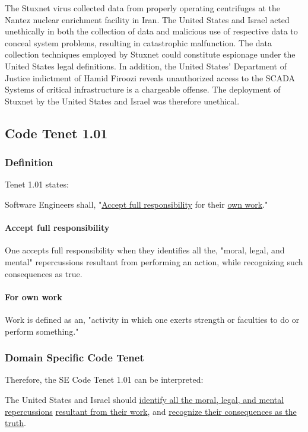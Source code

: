 \documentclass[12pt]{article}
\begin{document}
\begin{multicols}{2}
The Stuxnet virus collected data from properly operating centrifuges at the Nantez nuclear enrichment facility in Iran. The United States and Israel acted unethically in both the collection of data and malicious use of respective data to conceal system problems, resulting in catastrophic malfunction. The data collection techniques employed by Stuxnet could constitute espionage under the United States legal definitions. In addition, the United States' Department of Justice indictment of Hamid Firoozi reveals unauthorized access to the SCADA Systems of critical infrastructure is a chargeable offense. The deployment of Stuxnet by the United States and Israel was therefore unethical.


\subsection{Code Tenet 1.01}

\subsubsection{Definition}

Tenet 1.01 states:
\begin{framed}
Software Engineers shall, "\underline{Accept full responsibility} for their \underline{own work}."\cite{softwareEngineeringCodeOfEthics}
\end{framed}

\paragraph{Accept full responsibility}
One accepts full responsibility when they identifies all the, "moral, legal, and mental" repercussions resultant from performing an action, while recognizing such consequences as true.\cite{cambridgeDictionary}\cite{cambridgeDictionary}

\paragraph{For own work}
Work is defined as an, "activity in which one exerts strength or faculties to do or perform something."\cite{cambridgeDictionary}

\subsubsection{Domain Specific Code Tenet}

Therefore, the SE Code Tenet 1.01 can be interpreted:
\begin{framed}
The United States and Israel should \ul{identify all the moral, legal, and mental repercussions} \ul{resultant from their work}, and \ul{recognize their consequences as the truth}.
\end{framed}


\end{multicols}
\end{document}
